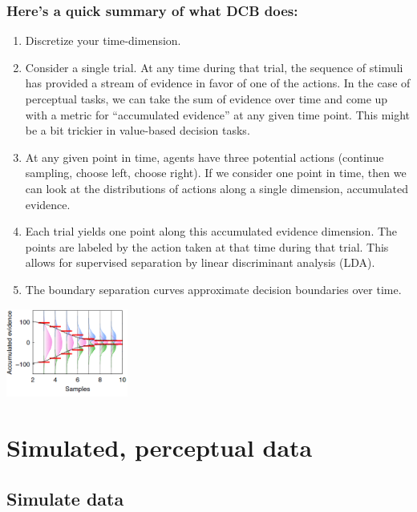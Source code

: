 \documentclass[
]{book}
\providecommand{\tightlist}{%
  \setlength{\itemsep}{0pt}\setlength{\parskip}{0pt}}
\begin{document}
\hypertarget{heres-a-quick-summary-of-what-dcb-does}{%
\subsubsection*{Here's a quick summary of what DCB does:}\label{heres-a-quick-summary-of-what-dcb-does}}

\begin{enumerate}
\def\labelenumi{\arabic{enumi}.}
\tightlist
\item
  Discretize your time-dimension.
\item
  Consider a single trial. At any time during that trial, the sequence of stimuli has provided a stream of evidence in favor of one of the actions. In the case of perceptual tasks, we can take the sum of evidence over time and come up with a metric for ``accumulated evidence'' at any given time point. This might be a bit trickier in value-based decision tasks.
\item
  At any given point in time, agents have three potential actions (continue sampling, choose left, choose right). If we consider one point in time, then we can look at the distributions of actions along a single dimension, accumulated evidence.
\item
  Each trial yields one point along this accumulated evidence dimension. The points are labeled by the action taken at that time during that trial. This allows for supervised separation by linear discriminant analysis (LDA).
\item
  The boundary separation curves approximate decision boundaries over time.
\end{enumerate}

\includegraphics[width=0.3\textwidth,height=\textheight]{images/dcb-example.PNG}

\hypertarget{simulated-perceptual-data-1}{%
\section{Simulated, perceptual data}\label{simulated-perceptual-data-1}}

\hypertarget{simulate-data}{%
\subsection{Simulate data}\label{simulate-data}}
\end{document}
